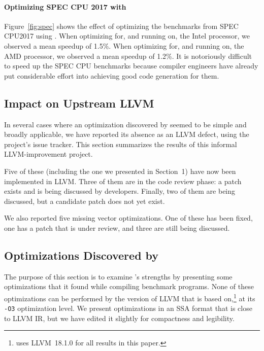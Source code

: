 \paragraph{Optimizing SPEC CPU 2017 with \minotaur{}}

Figure~\ref{fig:spec} shows the effect of optimizing the benchmarks
from SPEC CPU2017 using \minotaur.
%
When optimizing for, and running on, the Intel processor, we observed
a mean speedup of 1.5\%.
%
When optimizing for, and running on, the AMD processor, we observed a
mean speedup of 1.2\%.
%
It is notoriously difficult to speed up the SPEC CPU benchmarks
because compiler engineers have already put considerable effort into
achieving good code generation for them.


\subsection{Impact on Upstream LLVM}

In several cases where an optimization discovered by \minotaur{} seemed to
be simple and broadly applicable, we have reported its absence as an
LLVM defect, using the project's issue tracker.
%
This section summarizes the results of this informal LLVM-improvement
project.



%
Five of these (including the one we presented in Section~1) have now
been implemented in LLVM\@.
%
Three of them are in the code review phase: a patch exists and is
being discussed by developers.
%
Finally, two of them are being discussed, but a candidate patch does
not yet exist.


We also reported five missing vector optimizations.
%
One of these has been fixed, one has a patch that is under review, and
three are still being discussed.


\subsection{Optimizations Discovered by \minotaur}
\label{sec:examples}

The purpose of this section is to examine \minotaur's strengths by
presenting some optimizations that it found while compiling benchmark
programs.
%
None of these optimizations can be performed by the version of LLVM
that \minotaur{} is based on,\footnote{\minotaur{} uses LLVM~18.1.0 for all
results in this paper.}  at its \texttt{-O3} optimization level.
%
We present optimizations in an SSA format that is close to LLVM IR,
but we have edited it slightly for compactness and legibility.

